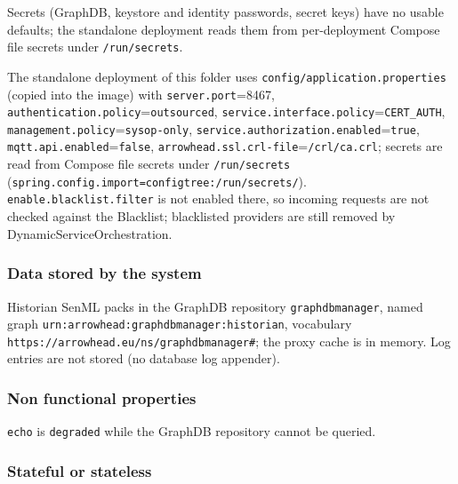 \documentclass[a4paper]{arrowhead}
\begin{document}
Secrets (GraphDB, keystore and identity passwords, secret keys) have no usable defaults; the standalone deployment reads them from per-deployment Compose file secrets under \texttt{/\allowbreak{}run/\allowbreak{}secrets}.

The standalone deployment of this folder uses \texttt{config/\allowbreak{}application.\allowbreak{}properties} (copied into the image) with \texttt{server.\allowbreak{}port}=8467, \texttt{authentication.\allowbreak{}policy}=\texttt{outsourced}, \texttt{service.\allowbreak{}interface.\allowbreak{}policy}=\texttt{CERT\_AUTH}, \texttt{management.\allowbreak{}policy}=\texttt{sysop-\allowbreak{}only}, \texttt{service.\allowbreak{}authorization.\allowbreak{}enabled}=\texttt{true}, \texttt{mqtt.\allowbreak{}api.\allowbreak{}enabled}=\texttt{false}, \texttt{arrowhead.\allowbreak{}ssl.\allowbreak{}crl-\allowbreak{}file}=\texttt{/\allowbreak{}crl/\allowbreak{}ca.\allowbreak{}crl}; secrets are read from Compose file secrets under \texttt{/\allowbreak{}run/\allowbreak{}secrets} (\texttt{spring.\allowbreak{}config.\allowbreak{}import=\allowbreak{}configtree:\allowbreak{}/\allowbreak{}run/\allowbreak{}secrets/}). \texttt{enable.\allowbreak{}blacklist.\allowbreak{}filter} is not enabled there, so incoming requests are not checked against the Blacklist; blacklisted providers are still removed by Dynamic\allowbreak{}Service\allowbreak{}Orchestration.

\subsubsection{Data stored by the system}

Historian SenML packs in the GraphDB repository \texttt{graphdbmanager}, named graph \texttt{urn:\allowbreak{}arrowhead:\allowbreak{}graphdbmanager:\allowbreak{}historian}, vocabulary \texttt{https://\allowbreak{}arrowhead.eu/\allowbreak{}ns/\allowbreak{}graphdbmanager\#}; the proxy cache is in memory. Log entries are not stored (no database log appender).

\subsubsection{Non functional properties}

\texttt{echo} is \texttt{degraded} while the GraphDB repository cannot be queried.

\subsubsection{Stateful or stateless}
\end{document}
